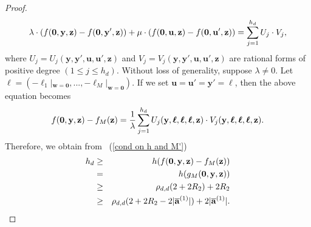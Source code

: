 \documentclass[12pt]{amsart}
\theoremstyle{definition}
\theoremstyle{remark}
\numberwithin{equation}{section}
\begin{document}
\begin{proof}
\begin{eqnarray}
\lambda \cdot ({f}( \mathbf{0}, \mathbf{y}, \mathbf{z} )  -  {f}( \mathbf{0}, \mathbf{y}', \mathbf{z} ) )
+ \mu \cdot ({f}( \mathbf{0}, \mathbf{u}, \mathbf{z} ) - {f}( \mathbf{0}, \mathbf{u}', \mathbf{z} ) )
= \sum_{j=1}^{h_d} U_j \cdot V_j,
\notag
\end{eqnarray}
where $U_j = U_j( \mathbf{y}, \mathbf{y}', \mathbf{u}, \mathbf{u}', \mathbf{z} )$ and $V_j =
V_j( \mathbf{y}, \mathbf{y}', \mathbf{u}, \mathbf{u}', \mathbf{z} )$ are rational forms of positive degree $(1 \leq j \leq h_d)$.
Without loss of generality, suppose $\lambda \not = 0$.
Let $\boldsymbol{\ell} = (- \ell_1 |_{\mathbf{w} = \mathbf{0}}, ..., - \ell_M |_{\mathbf{w} = \mathbf{0}} )$. If we set
$\mathbf{u} = \mathbf{u}' = \mathbf{y}' = \boldsymbol{\ell}$,
then the above equation becomes
\begin{eqnarray}
{f}( \mathbf{0}, \mathbf{y}, \mathbf{z} )  -  {f}_M( \mathbf{z} )
= \frac{1}{\lambda} \sum_{j=1}^{h_d}  U_j (\mathbf{y}, \boldsymbol{\ell},\boldsymbol{\ell}, \boldsymbol{\ell}, \mathbf{z}) \cdot V_j (\mathbf{y}, \boldsymbol{\ell}, \boldsymbol{\ell},\boldsymbol{\ell}, \mathbf{z}).
\notag
\end{eqnarray}
Therefore, we obtain from ~(\ref{cond on h and M'})
\begin{eqnarray}
h_d &\geq& h ({f}( \mathbf{0}, \mathbf{y}, \mathbf{z} )  -  {f}_M( \mathbf{z} ) )
\notag
\\
&=& h ({g_M}( \mathbf{0}, \mathbf{y}, \mathbf{z} ) )
\notag
\\
&\geq& \rho_{d,d}( 2 + 2 R_2) + 2 R_2
\notag
\\
&\geq& \rho_{d,d}( 2 + 2 R_2 - 2 | { \overline{\mathbf{a} }}^{(1)}|) + 2 | { \overline{\mathbf{a} }}^{(1)}|.
\notag
\end{eqnarray}


\end{proof}
\end{document}
